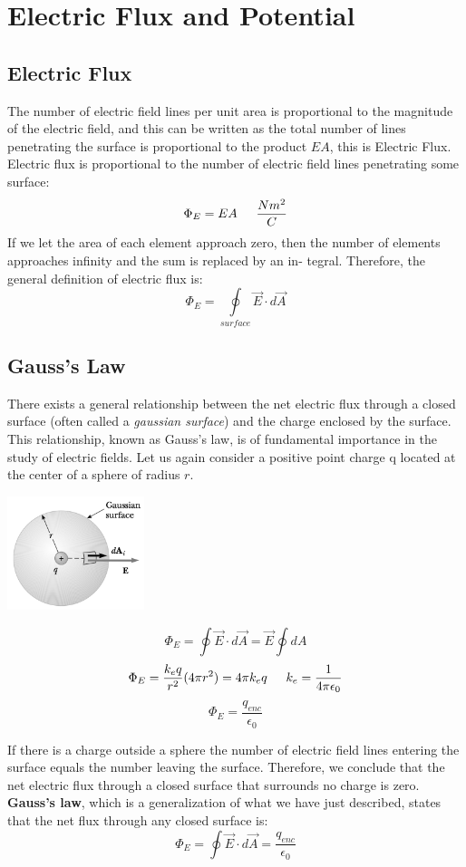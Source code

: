 \documentclass{article}
\begin{document}
\section{Electric Flux and Potential}
\subsection{Electric Flux}
The number of electric field lines per unit area is proportional to the magnitude of the electric field, and this can be written as the total number of lines penetrating the surface is proportional to the product $EA$, this is Electric Flux. Electric flux is proportional to the number of electric field lines penetrating some surface:
\[
\Phi_E=EA \indent\frac{Nm^2}{C}
\]
If we let the area of each element approach zero, then the number of elements approaches infinity and the sum is replaced by an in- tegral. Therefore, the general definition of electric flux is:
\[
\Phi_E=\underset{surface}{\oint}\vec{E}\cdot d\vec{A}
\]

\subsection{Gauss's Law}
There exists a general relationship between the net electric flux through a closed surface (often called a \textit{gaussian surface}) and the charge enclosed by the surface. This relationship, known as Gauss’s law, is of fundamental importance in the study of electric fields. Let us again consider a positive point charge q located at the center of a sphere of radius $r$.
\begin{multicols}{2}
  \centerline{\includegraphics[width=4cm]{gaussLaw.png}}
  \columnbreak
  \[
  \Phi_E=\oint\vec{E}\cdot d\vec{A}=\vec{E}\oint dA
  \]
  \[
  \Phi_E=\frac{k_eq}{r^2}(4\pi r^2)=4\pi k_eq \indent
  k_e=\frac{1}{4\pi\epsilon_0}
  \]
  \[
  \Phi_E=\frac{q_{enc}}{\epsilon_0}
  \]
\end{multicols}
If there is a charge outside a sphere the number of electric field lines entering the surface equals the number leaving the surface. Therefore, we conclude that the net electric flux through a closed surface that surrounds no charge is zero. \textbf{Gauss’s law}, which is a generalization of what we have just described, states that the net flux through any closed surface is:
\[
\Phi_E=\oint\vec{E}\cdot d\vec{A}=\frac{q_{enc}}{\epsilon_0}
\]
\end{document}
